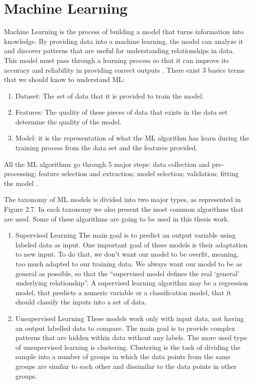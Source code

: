 \section{Machine Learning} 
\label{sub:if_you_use_this_template} 

Machine Learning is the process of building a model that turns information into knowledge. By providing data into a machine learning, the model can analyze it and discover patterns that are useful for understanding relationships in data. This model must pass through a learning process so that it can improve its accuracy and reliability in providing correct outputs \cite{OLD_15_WIND} \cite{46_ML}.
There exist 3 basics terms that we should know to understand ML:

\begin{enumerate}
    \item 
Dataset: The set of data that it is provided to train the model.
    \item
Features: The quality of these pieces of data that exists in the data set determine the quality of the model.
    \item
Model: it is the representation of what the ML algorithm has learn during the training process from the data set and the features provided.
\end{enumerate}

All the ML algorithms go through 5 major steps: data collection and pre-processing; feature selection and extraction; model selection; validation; fitting the model \cite{OLD_15_WIND} \cite{46_ML}.


The taxonomy of ML models is divided into two major types, as represented in Figure 2.7. In each taxonomy we also present the most common algorithms that are used. Some of these algorithms are going to be used in this thesis work.

\begin{enumerate}
    \item{Supervised Learning}
The main goal is to predict an output variable using labeled data as input. One important goal of these models is their adaptation to new input. To do that, we don’t want our model to be overfit, meaning, too much adapted to our training data. We always want our model to be as general as possible, so that the “supervised model defines the real ‘general’ underlying relationship”. A supervised learning algorithm may be a regression model, that predicts a numeric variable or a classification model, that it should classify the inputs into a set of data.

    \item{Unsupervised Learning}
These models work only with input data, not having an output labelled data to compare. The main goal is to provide complex patterns that are hidden within data without any labels. The more used type of unsupervised learning is clustering. Clustering is the task of dividing the sample into a number of groups in which the data points from the same groups are similar to each other and dissimilar to the data points in other groups.
\end{enumerate}

